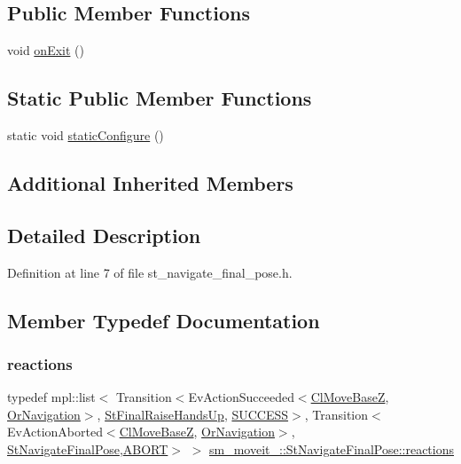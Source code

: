 \subsection*{Public Member Functions}
\begin{DoxyCompactItemize}
\item 
void \hyperlink{structsm__moveit__4_1_1StNavigateFinalPose_a8ff48aa4f7ee06e0a0d3b603acefd793}{on\+Exit} ()
\end{DoxyCompactItemize}
\subsection*{Static Public Member Functions}
\begin{DoxyCompactItemize}
\item 
static void \hyperlink{structsm__moveit__4_1_1StNavigateFinalPose_a9de8332e911fae69f904c63fd2a2250d}{static\+Configure} ()
\end{DoxyCompactItemize}
\subsection*{Additional Inherited Members}


\subsection{Detailed Description}


Definition at line 7 of file st\+\_\+navigate\+\_\+final\+\_\+pose.\+h.



\subsection{Member Typedef Documentation}
\mbox{\label{structsm__moveit__4_1_1StNavigateFinalPose_a4b58294d4af366f631ae201681a57093}} 
\subsubsection{\texorpdfstring{reactions}{reactions}}
{\footnotesize\ttfamily typedef mpl\+::list$<$ Transition$<$Ev\+Action\+Succeeded$<$\hyperlink{classcl__move__base__z_1_1ClMoveBaseZ}{Cl\+Move\+BaseZ}, \hyperlink{classsm__moveit__4_1_1OrNavigation}{Or\+Navigation}$>$, \hyperlink{structsm__moveit__4_1_1StFinalRaiseHandsUp}{St\+Final\+Raise\+Hands\+Up}, \hyperlink{classSUCCESS}{S\+U\+C\+C\+E\+SS}$>$, Transition$<$Ev\+Action\+Aborted$<$\hyperlink{classcl__move__base__z_1_1ClMoveBaseZ}{Cl\+Move\+BaseZ}, \hyperlink{classsm__moveit__4_1_1OrNavigation}{Or\+Navigation}$>$, \hyperlink{structsm__moveit__4_1_1StNavigateFinalPose}{St\+Navigate\+Final\+Pose},\hyperlink{classABORT}{A\+B\+O\+RT}$>$ $>$ \hyperlink{structsm__moveit__4_1_1StNavigateFinalPose_a4b58294d4af366f631ae201681a57093}{sm\+\_\+moveit\+\_\+::\+St\+Navigate\+Final\+Pose\+::reactions}}



